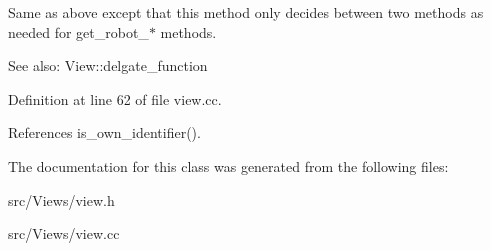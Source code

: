 Same as above except that this method only decides between two methods as needed for get\_\-robot\_\-$\ast$ methods. \begin{Desc}
\item[See also:]View::delgate\_\-function \end{Desc}


Definition at line 62 of file view.cc.

References is\_\-own\_\-identifier().

The documentation for this class was generated from the following files:\begin{CompactItemize}
\item 
src/Views/view.h\item 
src/Views/view.cc\end{CompactItemize}
